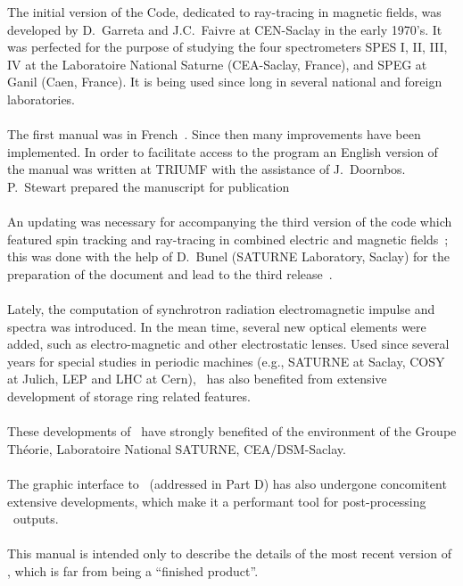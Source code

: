 \noindent The initial  version of the Code, dedicated to  ray-tracing in magnetic fields,
 was developed  by D.~Garreta and J.C.~Faivre  at CEN-Saclay in the early 1970's.
 It was perfected for the purpose of studying the four spectrometers SPES I, II, III, IV  
at the  Laboratoire National Saturne (CEA-Saclay, France), and SPEG at Ganil 
(Caen, France). It is being used since long in several national and foreign laboratories.
\\
\\
\noindent The first manual was in French~\cite{Biblio1}. %
 Since then many improvements have been implemented.  In order to facilitate access to 
the program an English version of the manual was written at TRIUMF with the assistance of 
J.~Doornbos. P.~Stewart prepared the manuscript for publication~\cite{Biblio2}%
\\
\\
\noindent  An updating was necessary for accompanying the third version of the code which featured 
 spin tracking and ray-tracing in combined electric and magnetic fields~; 
 this was done with the help of 
D.~Bunel (SATURNE Laboratory, Saclay) for the preparation of the document and lead to the third 
release~\cite{Biblio2b}.
\\
\\
\noindent Lately,  the computation of 
synchrotron radiation electromagnetic impulse and spectra was introduced. In the mean 
time, several new optical elements were added, such as 
electro-magnetic and other electrostatic lenses. Used since several years for special studies in periodic
machines (e.g., SATURNE at Saclay, COSY at Julich, LEP and LHC at Cern),  
\zgou\  has also benefited from extensive development of storage ring related features.
\\
\\
\noindent These  developments of \zgou\ 
 have strongly benefited of the environment of the Groupe Th\'eorie, 
Laboratoire National SATURNE, CEA/DSM-Saclay. 
\\
\\
The graphic  interface to \zgou\ (addressed in Part D) has also undergone concomitent extensive  
developments, which make it a performant tool for post-processing \zgou\  outputs.
\\
\\
\noindent  This manual is intended only to describe the details of the most
recent version of \zgou, which is far from being a ``finished product''.

\newpage

